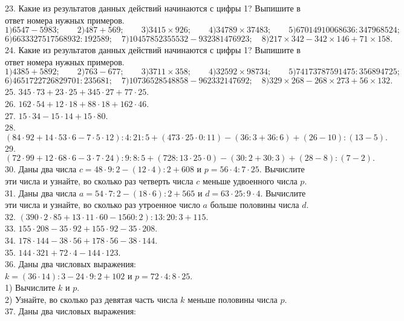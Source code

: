 23. Какие из результатов данных действий начинаются с цифры 1? Выпишите в ответ номера нужных примеров.\\
$1)6547-5983;\qquad 2)487+569;\qquad 3)3415\times926;\qquad 4)34789\times37483;\qquad5) 67014910068636:347968524;$
$6)6633327517568932:192589;\quad7)10457852355532-932381476923;\quad8)217\times342-342\times146+71\times158.$\\
24. Какие из результатов данных действий начинаются с цифры 1? Выпишите в ответ номера нужных примеров.\\
$1)4385+5892;\qquad 2)763-677;\qquad 3)3711\times358;\qquad4)32592\times98734;\qquad5) 74173787591475:356894725;$
$6)4651722726829701:235681;\quad7)10736528548858-962332147692;\quad8)329\times268-268\times273+56\times132.$\\
25. $345\cdot73 + 23\cdot25 + 345\cdot27 + 77\cdot25.$\\
26. $162\cdot54+12\cdot18 + 88\cdot18+ 162\cdot46.$\\
27. $15\cdot34-15\cdot14+15\cdot80.$\\
28. $(84\cdot92+14\cdot53\cdot6-7\cdot5\cdot12):4:21:5+(473\cdot25\cdot0:11)-(36:3+36:6)+(26-10):(13-5).$\\
29. $(72\cdot99+12\cdot68\cdot6-3\cdot7\cdot24):9:8:5+(728:13\cdot25\cdot0)-(30:2+30:3)+(28-8):(7-2).$\\
30. Даны два числа $c=48\cdot9:2-(12\cdot4):2+608$ и $p=56\cdot4:7\cdot25.$ Вычислите эти числа и узнайте, во сколько раз четверть числа $c$ меньше удвоенного числа $p.$\\
31. Даны два числа $a=54\cdot7:2-(18\cdot6):2+565$ и $d=63\cdot25:9\cdot4.$ Вычислите эти числа и узнайте, во сколько раз утроенное число $a$ больше половины числа $d.$\\
32. $(390\cdot2\cdot85+13\cdot11\cdot60-1560:2):13:20:3+115.$\\
33. $155\cdot208-35\cdot92+155\cdot92-35\cdot208.$\\
34. $178\cdot144-38\cdot56+178\cdot56-38\cdot144.$\\
35. $144\cdot321+72\cdot4-144\cdot123.$\\
36. Даны два числовых выражения:\\
$k=(36\cdot14):3-24\cdot9:2+102$ и $p=72\cdot4:8\cdot25.$\\
1) Вычислите $k$ и $p.$\\
2) Узнайте, во сколько раз девятая часть числа $k$ меньше половины числа $p.$\\
37. Даны два числовых выражения:\\
